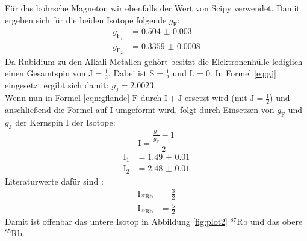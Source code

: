\documentclass[
  bibliography=totoc,     %
  captions=tableheading,  %
  titlepage=firstiscover, %
]{scrartcl}
\begin{document}
\noindent
Für das bohrsche Magneton wir ebenfalls der Wert von Scipy \cite{scipyconst} verwendet.
Damit ergeben sich für die beiden Isotope folgende $g_\mathup{F}$:
\begin{align*}
  g_{\mathup{F}_1} &= \num{0.504(3)}\\
  g_{\mathup{F}_2} &= \num{0.3359(8)}
\end{align*}
\noindent
Da Rubidium zu den Alkali-Metallen gehört besitzt die Elektronenhülle lediglich
einen Gesamtspin von $\mathup{J} = \frac{1}{2}$. Dabei ist $\mathup{S} = \frac{1}{2}$
und $\mathup{L} = 0$. In Formel \ref{eq:gj} eingesetzt ergibt sich damit:
$g_\mathup{J} = \num{2.0023}$.\\
Wenn nun in Formel \ref{eqn:gflande} $\mathup{F}$ durch $\mathup{I}+\mathup{J}$
ersetzt wird (mit $\mathup{J} = \frac{1}{2}$) und anschließend die Formel auf $\mathup{I}$ umgeformt wird,
folgt durch Einsetzen von $g_\mathup{F}$ und $g_\mathup{J}$ der Kernspin $\mathup{I}$
der Isotope:
\begin{equation}
  \mathup{I} = \frac{\frac{g_\mathup{J}}{g_\mathup{F}}-1}{2}
\end{equation}
\begin{align*}
  \mathup{I}_1 &= \num{1.49(1)}\\
  \mathup{I}_2 &= \num{2.48(1)}
\end{align*}
Literaturwerte dafür sind \cite{rubwi}:
\begin{align*}
  \mathup{I}_{^{87}\mathup{Rb}} &= \frac{3}{2}\\
  \mathup{I}_{^{85}\mathup{Rb}} &= \frac{5}{2}
\end{align*}
Damit ist offenbar das untere Isotop in Abbildung \ref{fig:plot2} $^{87}\mathup{Rb}$
und das obere $^{85}\mathup{Rb}$.
\end{document}
